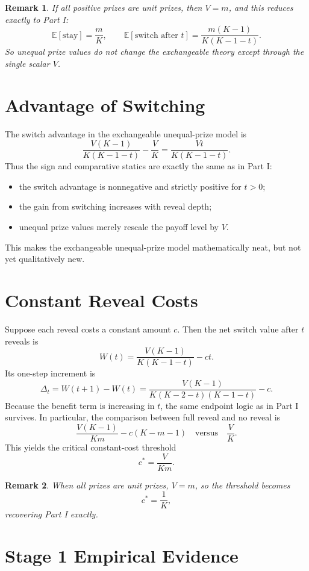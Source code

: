 \documentclass[11pt]{article}
\newtheorem{remark}{Remark}
\newcommand{\E}{\mathbb{E}}
\begin{document}
\begin{remark}
If all positive prizes are unit prizes, then $V=m$, and this reduces exactly to
Part I:
\[
  \E[\text{stay}]=\frac{m}{K},
  \qquad
  \E[\text{switch after }t]=\frac{m(K-1)}{K(K-1-t)}.
\]
So unequal prize values do not change the exchangeable theory except through the
single scalar $V$.
\end{remark}

\section{Advantage of Switching}

The switch advantage in the exchangeable unequal-prize model is
\[
  \frac{V(K-1)}{K(K-1-t)}-\frac{V}{K}
  =
  \frac{Vt}{K(K-1-t)}.
\]
Thus the sign and comparative statics are exactly the same as in Part I:
\begin{itemize}
\item the switch advantage is nonnegative and strictly positive for $t>0$;
\item the gain from switching increases with reveal depth;
\item unequal prize values merely rescale the payoff level by $V$.
\end{itemize}

This makes the exchangeable unequal-prize model mathematically neat, but not yet
qualitatively new.

\section{Constant Reveal Costs}

Suppose each reveal costs a constant amount $c$. Then the net switch value
after $t$ reveals is
\[
  W(t)=\frac{V(K-1)}{K(K-1-t)}-ct.
\]
Its one-step increment is
\[
  \Delta_t=W(t+1)-W(t)
  =
  \frac{V(K-1)}{K(K-2-t)(K-1-t)}-c.
\]
Because the benefit term is increasing in $t$, the same endpoint logic as in
Part I survives. In particular, the comparison between full reveal and no
reveal is
\[
  \frac{V(K-1)}{Km}-c(K-m-1)
  \quad\text{versus}\quad
  \frac{V}{K}.
\]
This yields the critical constant-cost threshold
\[
  c^*=\frac{V}{Km}.
\]

\begin{remark}
When all prizes are unit prizes, $V=m$, so the threshold becomes
\[
  c^*=\frac{1}{K},
\]
recovering Part I exactly.
\end{remark}

\section{Stage 1 Empirical Evidence}
\end{document}
